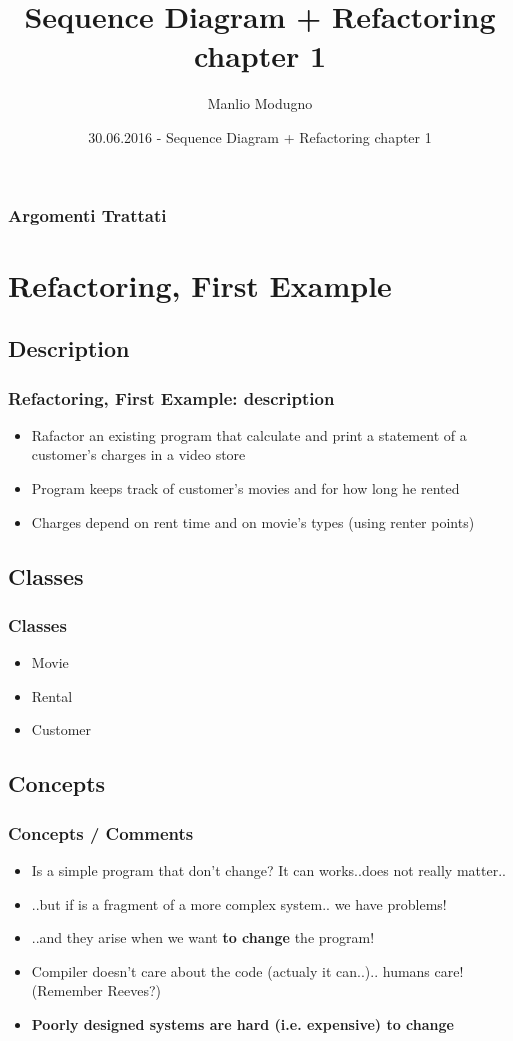 \documentclass{beamer}
\title{Sequence Diagram + Refactoring chapter 1}
\author{Manlio Modugno}
\institute[GMTechnologies]
\date[30.06.2016] 
{30.06.2016 - Sequence Diagram + Refactoring chapter 1}
\begin{document}
\begin{frame}
  \titlepage
\end{frame}

\begin{frame}
  \frametitle{Argomenti Trattati}
  \tableofcontents
\end{frame}

\section{Refactoring, First Example}
\subsection{Description}
\begin{frame}
  \frametitle{Refactoring, First Example: description}
  \begin{itemize}
  		\item Rafactor an existing program that calculate and print a statement of a customer's charges in a video store
		\item Program keeps track of customer's movies and for how long he rented
		\item Charges depend on rent time and on movie's types (using renter points)
  \end{itemize}
\end{frame}

\subsection{Classes}
\begin{frame}
  \frametitle{Classes}
  \begin{itemize}
  		\item Movie
		\item Rental
		\item Customer
  \end{itemize}
\end{frame}

\subsection{Concepts}
\begin{frame}
  \frametitle{Concepts / Comments}
  \begin{itemize}
  		\item<+-> Is a simple program that don't change? It can works..does not really matter..
		\item<+-> ..but if is a fragment of a more complex system.. we have problems!
		\item<+-> ..and they arise when we want \textbf{to change} the program!
		\item<+-> Compiler doesn't care about the code (actualy it can..).. humans care! (Remember Reeves?)
		\item<+-> \textbf{Poorly designed systems are hard (i.e. expensive) to change}
  \end{itemize}
\end{frame}
\end{document}
